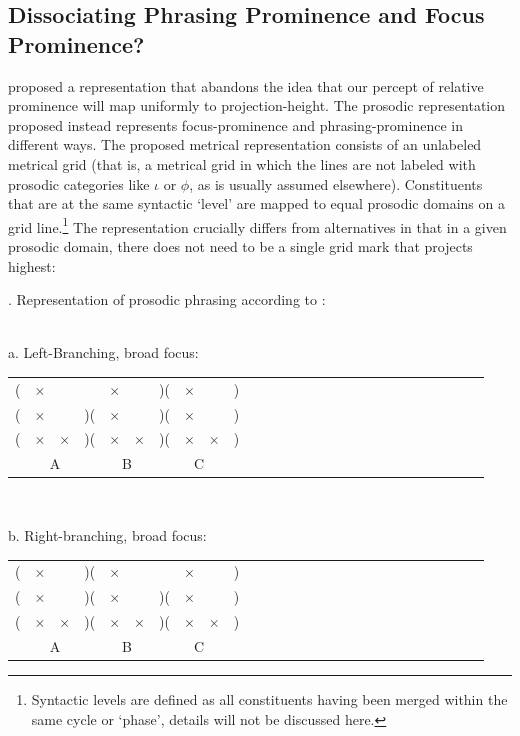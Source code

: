 \documentclass[preprint,review,12pt,authoryear,times]{elsarticle}
\newcommand{\g}{$\times$}
\begin{document}
\subsection{Dissociating Phrasing Prominence and Focus Prominence?}

\citet{wagner05recursion} proposed a representation that abandons the idea that our percept of relative prominence will map uniformly to projection-height. The prosodic representation proposed instead represents focus-prominence and phrasing-prominence in different ways. The proposed metrical representation consists of an unlabeled metrical grid (that is, a metrical grid in which the lines are not labeled with prosodic categories like $\iota$ or $\phi$, as is usually assumed elsewhere). Constituents that are at the same syntactic `level'  are mapped to equal prosodic domains on a grid line.\footnote{Syntactic levels are defined as all constituents having been merged within the same cycle or `phase', details will not be discussed here.}  The representation crucially differs from alternatives in that in a given prosodic domain, there does not need to be a single grid mark that projects highest:

\ex. Representation of prosodic phrasing according to  \citet{wagner05recursion,wagner10nllt}:\\\label{phraspromYo}
\vspace{-10pt}
\ \\
\parbox{2in}{\footnotesize a. Left-Branching, broad focus:\\
\vspace{-12pt}
\setlength{\unitlength}{1cm}
\setlength\extrarowheight{-3pt}
 \begin{tabular}{ccccccccccccccccccccccccccc}
(&\g&&&\g&&)(&\g&&)&\\
(&\g&&)(&\g&&)(&\g&&)&\\
(&\g&\g&)(&\g&\g&)(&\g&\g&)&\\
\multicolumn{4}{c}{A}&\multicolumn{2}{c}{B}&\multicolumn{4}{c}{C}\\
\end{tabular}
}\parbox{0,45in}{\ }\parbox{2in}{\footnotesize b. Right-branching, broad focus:\\
\vspace{-12pt}
\setlength{\unitlength}{1cm}
\setlength\extrarowheight{-3pt}
\begin{tabular}{ccccccccccccccccccccccccccc}
(&\g&&)(&\g&&&\g&&)&\\
(&\g&&)(&\g&&)(&\g&&)&\\
(&\g&\g&)(&\g&\g&)(&\g&\g&)&\\
\multicolumn{4}{c}{A}&\multicolumn{2}{c}{B}&\multicolumn{4}{c}{C}\\
\end{tabular}
}\label{libhi}
\end{document}
